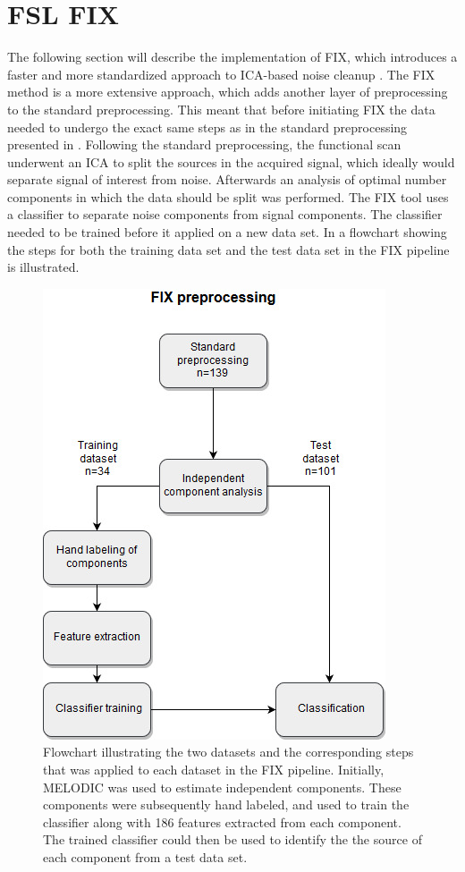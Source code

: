 
\section{FSL FIX}

The following section will describe the implementation of FIX, which introduces a faster and more standardized approach to ICA-based noise cleanup \cite{Salimi-Khorshidi2014}. The FIX method is a more extensive approach, which adds another layer of preprocessing to the standard preprocessing. This meant that before initiating FIX the data needed to undergo the exact same steps as in the standard preprocessing presented in . Following the standard preprocessing, the functional scan underwent an ICA to split the sources in the acquired signal, which ideally would separate signal of interest from noise. Afterwards an analysis of optimal number components in which the data should be split was performed. The FIX tool uses a classifier to separate noise components from signal components. The classifier needed to be trained before it applied on a new data set. In  a flowchart showing the steps for both the training data set and the test data set in the FIX pipeline is illustrated. 


\begin{figure}[H]                 
	\includegraphics[width=.6\textwidth]{figures/bMethods/FIX_flow} 
	\caption{Flowchart illustrating the two datasets and the corresponding steps that was applied to each dataset in the FIX pipeline. Initially, MELODIC was used to estimate independent components. These components were subsequently hand labeled, and used to train the classifier along with 186 features extracted from each component. The trained classifier could then be used to identify the the source of each component from a test data set.}
	\label{fig:meth:fix} 
\end{figure}

